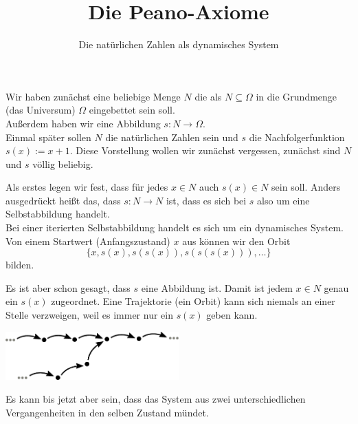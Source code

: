 \documentclass{beamer}
\title{Die Peano-Axiome}
\subtitle{Die natürlichen Zahlen als dynamisches System}
\date{}
\newcommand{\imgcaption}[1]{{\small #1}}
\begin{document}
\renewcommand*{\figurename}{Abb.}

\begin{frame}

\maketitle

\end{frame}

\begin{frame}
Wir haben zunächst eine beliebige Menge $N$ die als $N\subseteq\Omega$
in die Grundmenge (das Universum) $\Omega$ eingebettet sein soll.\\[1em]

Außerdem haben wir eine Abbildung $s\colon N\to\Omega$.\\[1em]

Einmal später sollen $N$ die natürlichen Zahlen sein und $s$ die
Nachfolgerfunktion $s(x):=x+1$. Diese Vorstellung wollen wir zunächst
vergessen, zunächst sind $N$ und $s$ völlig beliebig.
\end{frame}

\begin{frame}
Als erstes legen wir fest, dass für jedes $x\in N$ auch $s(x)\in N$
sein soll. Anders ausgedrückt heißt das, dass $s\colon N\to N$ ist,
dass es sich bei $s$ also um eine Selbstabbildung handelt.\\[1em]

Bei einer iterierten Selbstabbildung handelt es sich um ein dynamisches
System. Von einem Startwert (Anfangszustand) $x$ aus können wir den Orbit
\[\{x,s(x),s(s(x)),s(s(s(x))),\ldots\}\]
bilden.
\end{frame}

\begin{frame}
Es ist aber schon gesagt, dass $s$ eine Abbildung ist. Damit ist jedem
$x\in N$ genau ein $s(x)$ zugeordnet. Eine Trajektorie (ein Orbit)
kann sich niemals an einer Stelle verzweigen, weil es immer nur
ein $s(x)$ geben kann.
\end{frame}

\begin{frame}
\begin{center}
\includegraphics[width=0.5\textwidth]{img/Nichtinvertierbares-System.pdf}
\end{center}
\imgcaption{Es kann bis jetzt aber sein, dass das System aus zwei
unterschiedlichen Vergangenheiten in den selben Zustand mündet.}
\end{frame}
\end{document}
